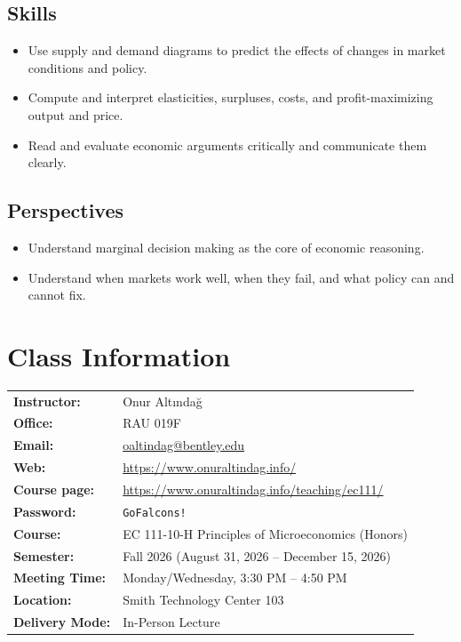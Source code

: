 \documentclass[11pt,letterpaper]{article}
\newcommand{\sectionname}{EC 111-10-H Principles of Microeconomics (Honors)}
\newcommand{\meetingtime}{Monday/Wednesday, 3:30 PM -- 4:50 PM}
\newcommand{\classroom}{Smith Technology Center 103}
\newcommand{\sectionname}{EC 111-20 Principles of Microeconomics}
\newcommand{\meetingtime}{Monday/Wednesday, 9:30 AM -- 10:50 AM}
\newcommand{\classroom}{Jennison Hall 412}
\begin{document}
\subsection*{Skills}
\begin{itemize}
    \item Use supply and demand diagrams to predict the effects of changes in market conditions and policy.
    \item Compute and interpret elasticities, surpluses, costs, and profit-maximizing output and price.
    \item Read and evaluate economic arguments critically and communicate them clearly.
\end{itemize}

\subsection*{Perspectives}
\begin{itemize}
    \item Understand marginal decision making as the core of economic reasoning.
    \item Understand when markets work well, when they fail, and what policy can and cannot fix.
\end{itemize}

\section*{Class Information}

\begin{tabularx}{\textwidth}{@{}lX@{}}
\textbf{Instructor:} & Onur Altındağ \\
\textbf{Office:} & RAU 019F \\
\textbf{Email:} & \href{mailto:oaltindag@bentley.edu}{oaltindag@bentley.edu} \\
\textbf{Web:} & \url{https://www.onuraltindag.info/} \\
\textbf{Course page:} & \url{https://www.onuraltindag.info/teaching/ec111/} \\
\textbf{Password:} & \texttt{GoFalcons!} \\[0.3cm]
\textbf{Course:} & \sectionname \\
\textbf{Semester:} & Fall 2026 (August 31, 2026 – December 15, 2026) \\
\textbf{Meeting Time:} & \meetingtime \\
\textbf{Location:} & \classroom \\
\textbf{Delivery Mode:} & In-Person Lecture \\
\end{tabularx}
\end{document}
